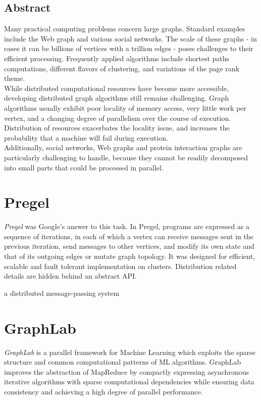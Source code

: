 \documentclass[letterpaper,twocolumn,10pt]{article}
\begin{document}
\subsection*{Abstract}
Many practical computing problems concern large graphs. Standard examples include the Web graph and various social networks. The scale of these graphs - in cases it can be billions of vertices with a trillion edges - poses challenges to their efficient processing.
Frequently applied algorithms include shortest paths computations, different flavors of clustering, and variations of the page rank theme.\\
While distributed computational resources have become more accessible, developing distributed graph algorithms still remains challenging.
Graph algorithms usually exhibit poor locality of memory access, very little work per vertex, and a changing degree of parallelism over the course of execution. Distribution of resources exacerbates the locality issue, and increases the probability that a machine 
will fail during execution.\\
Additionally, social networks, Web graphs and protein interaction graphs are particularly challenging to handle, because they cannot be readily decomposed into small parts that could be processed in parallel.



\section{Pregel}
\textit{Pregel} was Google's answer to this task. In Pregel, programs are expressed as a sequence of iterations, in each of which a vertex can receive messages sent in the previous iteration, send messages to other vertices, and modify its own state and that of its outgoing edges or mutate graph topology. It was designed for efficient, scalable and fault tolerant implementation on clusters. Distribution related details are hidden behind an abstract API.

a distributed message-passing system

\section{GraphLab}
\textit{GraphLab} is a parallel framework for Machine Learning which exploits the sparse structure and common computational patterns of ML algorithms.
GraphLab improves the abstraction of MapReduce by compactly expressing asynchronous iterative algorithms with sparse computational dependencies while ensuring data consistency and achieving a high degree of parallel performance.
\end{document}
